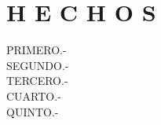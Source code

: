 \section*{H E C H O S}
\begin{description}
    \item[PRIMERO.-] \lipsum[1]
    \item[SEGUNDO.-] \lipsum[2]
    \item[TERCERO.-] \lipsum[3]
    \item[CUARTO.-] \lipsum[4]
    \item[QUINTO.-] \lipsum[5]
\end{description}